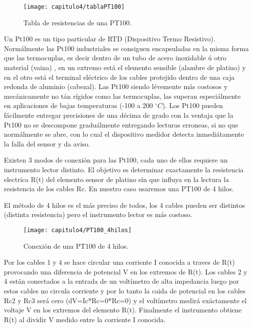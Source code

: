 \begin{figure}[H]%
\noindent \begin{centering}
\texttt{[image: capitulo4/tablaPT100]}
\par\end{centering}
\caption{\label{fig:tablaPT100} Tabla de resistencias de una PT100.}
\smallskip
\end{figure}
Un Pt100 es un tipo particular de RTD (Dispositivo Termo Resistivo). Normálmente las Pt100 industriales se consiguen encapsuladas en la misma forma que las termocuplas, es decir dentro de un tubo de acero inoxidable ú otro material (vaina) , en un extremo está el elemento sensible (alambre de platino) y en el otro está el terminal eléctrico de los cables protejido dentro de una caja redonda de aluminio (cabezal). 
Las Pt100 siendo lévemente más costosos y mecánicamente no tán rígidos como las termocuplas, las superan
especiálmente en aplicaciones de bajas temperaturas (-100 a 200  $^{\circ}C$).
Los Pt100 pueden fácilmente entregar precisiones de una décima de grado con la ventaja que la Pt100 no se descompone graduálmente entregando lecturas erroneas, si no que normálmente se abre, con lo cual el dispositivo medidor detecta inmediátamente la falla del sensor y da aviso. 

Existen 3 modos de conexión para las Pt100, cada uno de ellos requiere un instrumento lector distinto.
El objetivo es determinar exactamente la resistencia electrica R(t) del elemento sensor de platino sín que influya en la lectura la resistencia de los cables Rc. En nuestro caso usaremos una PT100 de 4 hilos.

El método de 4 hilos es el más preciso de todos, los 4 cables pueden ser distintos (distinta resistencia) pero el instrumento lector es más costoso.

\begin{figure}[H]%
\noindent \begin{centering}
\texttt{[image: capitulo4/PT100\_4hilos]}
\par\end{centering}
\caption{\label{fig:PT100_4hilos} Conexión de una PT100 de 4 hilos.}
\smallskip
\end{figure}

Por los cables 1 y 4 se hace circular una corriente I conocida a traves de R(t) provocando una diferencia de potencial V en los extremos de R(t). Los cables 2 y 4 están conectados a la entrada de un voltímetro de alta impedancia luego por estos cables no circula corriente y por lo tanto la caida de potencial en los cables Rc2 y Rc3 será cero (dV=Ic*Rc=0*Rc=0) y el voltímetro medirá exáctamente el voltaje V en los extremos del elemento R(t). Finalmente el instrumento obtiene R(t) al dividir V medido entre la corriente I conocida.

